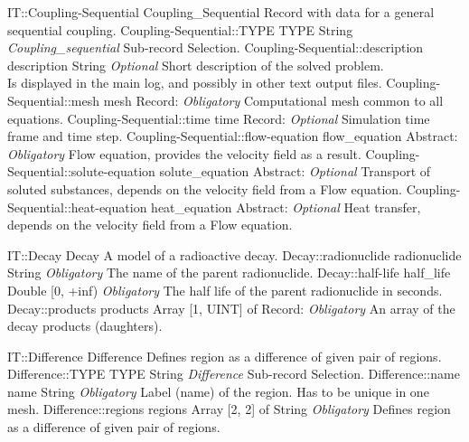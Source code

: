 \begin{RecordType}
	{IT::Coupling-Sequential}
	{Coupling{\_}Sequential}
	{} %
	{} %
	{{{Record with data for a general sequential coupling.}}}
		\RecKey
			{Coupling-Sequential::TYPE}
			{TYPE}
			{{String}}
			{ \it{Coupling{\_}sequential} }
			{{{Sub-record Selection.}}}
		\RecKey
			{Coupling-Sequential::description}
			{description}
			{{String}}
			{ \it{Optional} }
			{{{Short description of the solved problem.}\\{
Is displayed in the main log, and possibly in other text output files.}}}
		\RecKey
			{Coupling-Sequential::mesh}
			{mesh}
			{{Record}{: }}
			{ \it{Obligatory} }
			{{{Computational mesh common to all equations.}}}
		\RecKey
			{Coupling-Sequential::time}
			{time}
			{{Record}{: }}
			{ \it{Optional} }
			{{{Simulation time frame and time step.}}}
		\RecKey
			{Coupling-Sequential::flow-equation}
			{flow{\_}equation}
			{{Abstract}{: }}
			{ \it{Obligatory} }
			{{{Flow equation, provides the velocity field as a result.}}}
		\RecKey
			{Coupling-Sequential::solute-equation}
			{solute{\_}equation}
			{{Abstract}{: }}
			{ \it{Optional} }
			{{{Transport of soluted substances, depends on the velocity field from a Flow equation.}}}
		\RecKey
			{Coupling-Sequential::heat-equation}
			{heat{\_}equation}
			{{Abstract}{: }}
			{ \it{Optional} }
			{{{Heat transfer, depends on the velocity field from a Flow equation.}}}
\end{RecordType}
\begin{RecordType}
	{IT::Decay}
	{Decay}
	{} %
	{} %
	{{{A model of a radioactive decay.}}}
		\RecKey
			{Decay::radionuclide}
			{radionuclide}
			{{String}}
			{ \it{Obligatory} }
			{{{The name of the parent radionuclide.}}}
		\RecKey
			{Decay::half-life}
			{half{\_}life}
			{{Double [0, +inf)}}
			{ \it{Obligatory} }
			{{{The half life of the parent radionuclide in seconds.}}}
		\RecKey
			{Decay::products}
			{products}
			{{Array [1, UINT] of }{Record}{: }}
			{ \it{Obligatory} }
			{{{An array of the decay products (daughters).}}}
\end{RecordType}
\begin{RecordType}
	{IT::Difference}
	{Difference}
	{} %
	{} %
	{{{Defines region as a difference of given pair of regions.}}}
		\RecKey
			{Difference::TYPE}
			{TYPE}
			{{String}}
			{ \it{Difference} }
			{{{Sub-record Selection.}}}
		\RecKey
			{Difference::name}
			{name}
			{{String}}
			{ \it{Obligatory} }
			{{{Label (name) of the region. Has to be unique in one mesh.}}}
		\RecKey
			{Difference::regions}
			{regions}
			{{Array [2, 2] of }{String}}
			{ \it{Obligatory} }
			{{{Defines region as a difference of given pair of regions.}}}
\end{RecordType}
